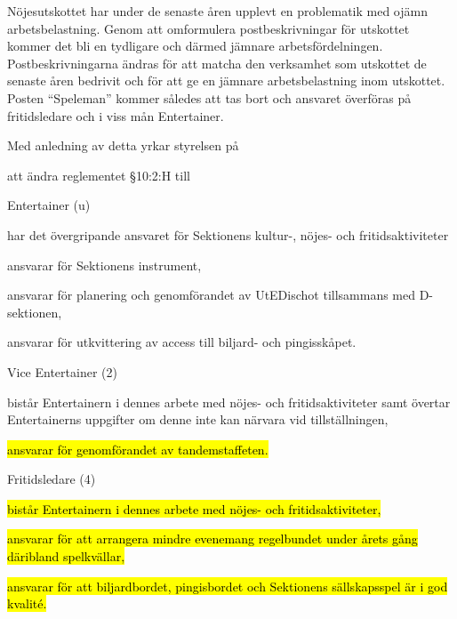 \documentclass[../_main/handlingar.tex]{subfiles}
\begin{document}
Nöjesutskottet har under de senaste åren upplevt en problematik med ojämn arbetsbelastning. Genom att omformulera postbeskrivningar för utskottet kommer det bli en tydligare och därmed jämnare arbetsfördelningen. Postbeskrivningarna ändras för att matcha den verksamhet som utskottet de senaste åren bedrivit och för att ge en jämnare arbetsbelastning inom utskottet. Posten “Speleman” kommer således att tas bort och ansvaret överföras på fritidsledare och i viss mån Entertainer.

Med anledning av detta yrkar styrelsen på
\begin{attsatser}
    \att att ändra reglementet \S10:2:H till\par

      Entertainer (u)
        \begin{tightdashlist}
            \item har det övergripande ansvaret för Sektionens kultur-, nöjes- och fritidsaktiviteter
            \item ansvarar för Sektionens instrument,
            \item ansvarar för planering och genomförandet av UtEDischot tillsammans med D-sektionen,
            \item ansvarar för utkvittering av access till biljard- och pingisskåpet.
        \end{tightdashlist}

      Vice Entertainer (2)
          \begin{tightdashlist}
              \item bistår Entertainern i dennes arbete med nöjes- och fritidsaktiviteter samt övertar Entertainerns uppgifter om denne inte kan närvara vid tillställningen,
              \item \hl{ansvarar för genomförandet av tandemstaffeten.}
          \end{tightdashlist}

      Fritidsledare (4)
          \begin{tightdashlist}
              \item \hl{bistår Entertainern i dennes arbete med nöjes- och fritidsaktiviteter,}
              \item \hl{ansvarar för att arrangera mindre evenemang regelbundet under årets gång däribland spelkvällar,}
              \item \hl{ansvarar för att biljardbordet, pingisbordet och Sektionens sällskapsspel är i god kvalité.}
          \end{tightdashlist}


\end{attsatser}
\end{document}
